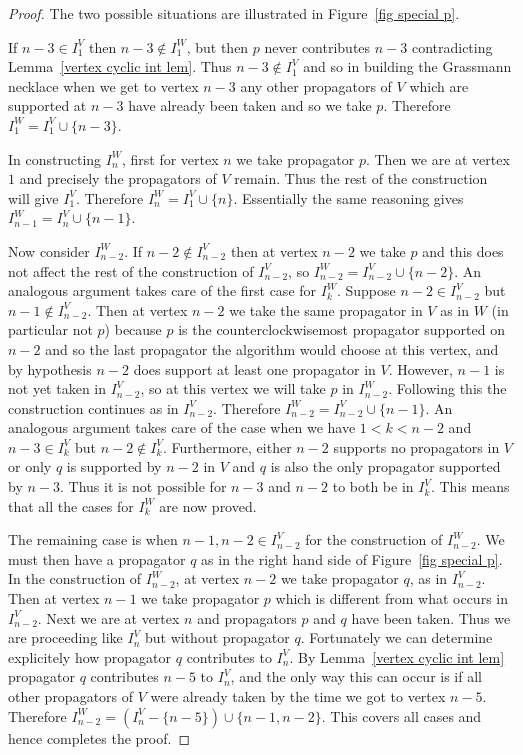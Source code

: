 \documentclass[11pt]{article}
\theoremstyle{remark}
\theoremstyle{definition}
\begin{document}
\begin{proof}
  The two possible situations are illustrated in Figure~\ref{fig special p}.

  If $n-3\in I_1^{V}$ then $n-3\not\in I_1^{W}$, but then $p$ never contributes $n-3$ contradicting Lemma~\ref{vertex cyclic int lem}.  Thus $n-3\not\in I_1^{V}$ and so in building the Grassmann necklace when we get to vertex $n-3$ any other propagators of $V$ which are supported at $n-3$ have already been taken and so we take $p$.  Therefore $I_1^{W}= I_1^{V}\cup \{n-3\}$.

  In constructing $I_n^{W}$, first for vertex $n$ we take propagator $p$.  Then we are at vertex $1$ and precisely the propagators of $V$ remain.  Thus the rest of the construction will give $I_1^{V}$.  Therefore $I_n^{W} = I_1^{V}\cup \{n\}$.  Essentially the same reasoning gives $I_{n-1}^{W} = I_n^{V}\cup \{n-1\}$.

  Now consider $I_{n-2}^{W}$.  If $n-2\not\in I_{n-2}^{V}$ then at vertex $n-2$ we take $p$ and this does not affect the rest of the construction of $I_{n-2}^{V}$, so $I_{n-2}^{W} = I_{n-2}^{V}\cup \{n-2\}$.  An analogous argument takes care of the first case for $I_k^{W}$.  Suppose $n-2\in I_{n-2}^{V}$ but $n-1\not\in I_{n-2}^{V}$.  Then at vertex $n-2$ we take the same propagator in $V$ as in $W$ (in particular not $p$) because $p$ is the counterclockwisemost propagator supported on $n-2$ and so the last propagator the algorithm would choose at this vertex, and by hypothesis $n-2$ does support at least one propagator in $V$.  However, $n-1$ is not yet taken in $I_{n-2}^{V}$, so at this vertex we will take $p$ in $I_{n-2}^{W}$.  Following this the construction continues as in $I_{n-2}^{V}$.  Therefore $I_{n-2}^{W} = I_{n-2}^{V}\cup \{n-1\}$.  An analogous argument takes care of the case when we have $1<k<n-2$ and $n-3\in I_k^{V}$ but $n-2\not\in I_{k}^{V}$.  Furthermore, either $n-2$ supports no propagators in $V$ or only $q$ is supported by $n-2$ in $V$ and $q$ is also the only propagator supported by $n-3$.  Thus it is not possible for $n-3$ and $n-2$ to both be in $I_{k}^{V}$.  This means that all the cases for $I_k^{W}$ are now proved.

  The remaining case is when $n-1,n-2\in I_{n-2}^{V}$ for the construction of $I_{n-2}^{W}$.  We must then have a propagator $q$ as in the right hand side of Figure~\ref{fig special p}.  In the construction of $I_{n-2}^{W}$, at vertex $n-2$ we take propagator $q$, as in $I_{n-2}^{V}$.  Then at vertex $n-1$ we take propagator $p$ which is different from what occurs in $I_{n-2}^{V}$.  Next we are at vertex $n$ and propagators $p$ and $q$ have been taken.  Thus we are proceeding like $I_{n}^{V}$ but without propagator $q$.  Fortunately we can determine explicitely how propagator $q$ contributes to $I_{n}^{V}$.  By Lemma~\ref{vertex cyclic int lem} propagator $q$ contributes $n-5$ to $I_{n}^{V}$, and the only way this can occur is if all other propagators of $V$ were already taken by the time we got to vertex $n-5$.  Therefore $I_{n-2}^{W} = (I_{n}^{V} - \{n-5\}) \cup \{n-1, n-2\}$.  This covers all cases and hence completes the proof.
\end{proof}
\end{document}
